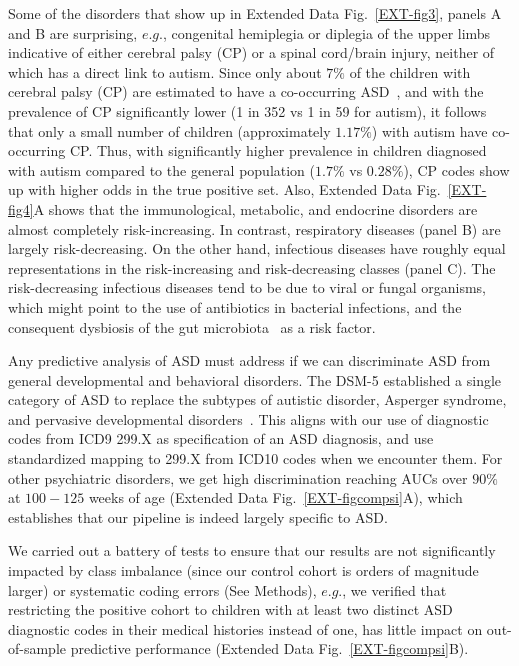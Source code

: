 \documentclass[onecolumn,,10pt]{IEEEtran}
\def\treatment{positive\xspace}
\begin{document}
Some of the disorders that show up in Extended Data Fig.~\ref{EXT-fig3}, panels A and B are surprising, $e.g.$,  congenital hemiplegia or diplegia of the upper limbs indicative of either  cerebral palsy (CP) or a spinal cord/brain injury, neither of which has a direct  link to autism. Since only about $7\%$ of the children with  cerebral palsy (CP) are estimated to have a  co-occurring ASD~\cite{cdccp,christensen2014prevalence}, and with the prevalence of CP  significantly lower  (1 in 352 vs 1 in 59 for autism), it follows that  only a small number of children (approximately $1.17\%$) with autism have co-occurring CP. Thus, with significantly higher prevalence in children diagnosed with autism compared to the general population ($1.7\%$ vs $0.28\%$), CP codes show  up with higher odds in the true positive set. Also, Extended Data Fig.~\ref{EXT-fig4}A shows that the immunological, metabolic, and endocrine disorders are almost completely risk-increasing. In contrast, respiratory diseases (panel B) are largely risk-decreasing. On the other hand, infectious diseases have roughly equal representations in the risk-increasing and risk-decreasing classes (panel C).
The risk-decreasing infectious diseases tend to be due to viral or fungal organisms, which might point to the use of antibiotics in bacterial infections, and the consequent dysbiosis of the gut microbiota~\cite{pmid30823414,pmid27957319} as a risk factor.

Any predictive analysis of ASD must address if we can
discriminate  ASD from  general developmental and behavioral disorders.
The DSM-5 established a single category of ASD to replace
the subtypes of autistic disorder, Asperger syndrome, and pervasive
developmental disorders~\cite{hyman2020identification}. This aligns with our use of diagnostic codes from ICD9 299.X as specification of an ASD diagnosis, and use standardized mapping to 299.X from ICD10 codes when we encounter them. For other psychiatric disorders, we get  high discrimination reaching AUCs over $90\%$ at $100 -125$ weeks of age (Extended Data Fig.~\ref{EXT-figcompsi}A), which establishes that our pipeline is indeed largely specific to ASD.
%

We carried out a battery of tests to ensure that our results are not significantly impacted
by class imbalance (since our control cohort is orders of magnitude larger) or systematic coding errors (See Methods), $e.g.$, we verified that restricting the \treatment cohort to children with at least two  distinct ASD diagnostic codes in their medical histories instead of one, has little impact on  out-of-sample predictive performance (Extended Data Fig.~\ref{EXT-figcompsi}B).
\end{document}
